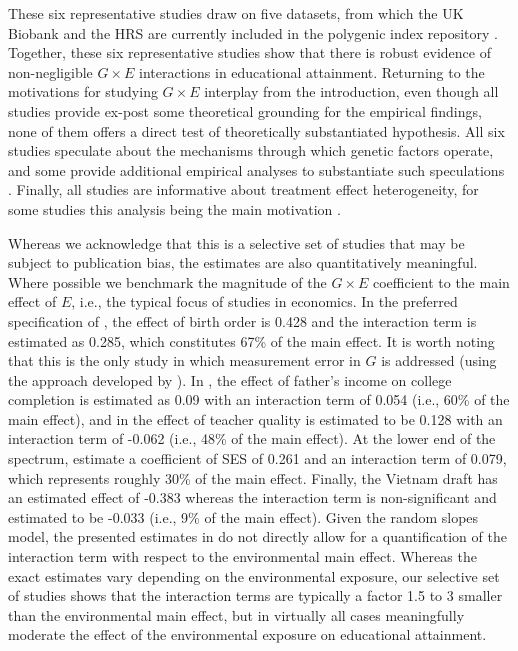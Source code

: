 \documentclass[12pt,a4paper]{article}
\begin{document}
\begin{bibunit}
These six representative studies draw on five datasets, from which the UK Biobank and the HRS are currently included in the polygenic index repository \citep{Becker2021}. Together, these six representative studies show that there is robust evidence of non-negligible $G \times E$ interactions in educational attainment. Returning to the motivations for studying $G \times E$ interplay from the introduction, even though all studies provide ex-post some theoretical grounding for the empirical findings, none of them offers a direct test of theoretically substantiated hypothesis. All six studies speculate about the mechanisms through which genetic factors operate, and some provide additional empirical analyses to substantiate such speculations \citep{Muslimova2020b,houmark2022genetic,papageorge2020genes,arold2022genetic}. Finally, all studies are informative about treatment effect heterogeneity, for some studies this analysis being the main motivation \citep{cheesman2022genes,Schmitz2017vietnam}.

Whereas we acknowledge that this is a selective set of studies that may be subject to publication bias, the estimates are also quantitatively meaningful. Where possible we benchmark the magnitude of the $G \times E$ coefficient to the main effect of $E$, i.e., the typical focus of studies in economics. In the preferred specification of \citet[][Table 2, last column]{Muslimova2020b}, the effect of birth order is 0.428 and the interaction term is estimated as 0.285, which constitutes 67\% of the main effect. It is worth noting that this is the only study in which measurement error in $G$ is addressed (using the approach developed by \cite{VanKippersluis2020}). In \citet[][Table B.2 in the Online Appendix]{papageorge2020genes}, the effect of father's income on college completion is estimated as 0.09 with an interaction term of 0.054 (i.e., 60\% of the main effect), and in \citet[][Table 3, column 1]{arold2022genetic} the effect of teacher quality is estimated to be 0.128 with an interaction term of -0.062 (i.e., 48\% of the main effect). At the lower end of the spectrum, \citet[][Table B1, column 3]{houmark2022genetic} estimate a coefficient of SES of 0.261 and an interaction term of 0.079, which represents roughly 30\% of the main effect. Finally, \citet[][Table 4, column 3]{Schmitz2017vietnam} the Vietnam draft has an estimated effect of -0.383 whereas the interaction term is non-significant and estimated to be -0.033 (i.e., 9\% of the main effect). Given the random slopes model, the presented estimates in \citet{cheesman2022genes} do not directly allow for a quantification of the interaction term with respect to the environmental main effect. Whereas the exact estimates vary depending on the environmental exposure, our selective set of studies shows that the interaction terms are typically a factor 1.5 to 3 smaller than the environmental main effect, but in virtually all cases meaningfully moderate the effect of the environmental exposure on educational attainment. 


\end{bibunit}
\end{document}
